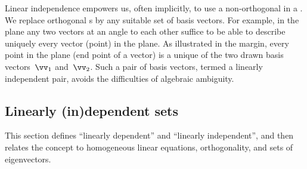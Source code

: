 Linear independence empowers us, often implicitly, to use a non-orthogonal  in a .
%
We replace orthogonal s by any suitable set of basis vectors.
For example, in the plane any two vectors at an angle to each other suffice to be able to describe uniquely every vector (point) in the plane.
As illustrated in the margin, every point in the plane (end point of a vector) is a unique  of the two drawn basis vectors~\(\vv_1\) and~\(\vv_2\).
Such a pair of basis vectors, termed a linearly independent pair, avoids the  difficulties of algebraic ambiguity.



\subsection{Linearly (in)dependent sets}

This section defines ``linearly dependent'' and ``linearly independent'', and then relates the concept to homogeneous linear equations, orthogonality, and sets of eigenvectors.

